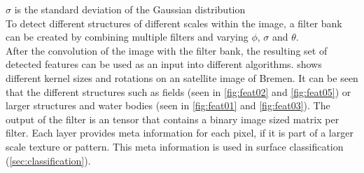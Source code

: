 \documentclass[a4paper, english]{article}
\begin{document}
    $\sigma$ is the standard deviation of the Gaussian distribution\\ 
%
    To detect different structures of different scales within the image, a filter bank can be created by combining multiple filters and varying $\phi$, $\sigma$ and $\theta$.\\
%
    After the convolution of the image with the filter bank, the resulting set of detected features can be used as an input into different algorithms.
     shows different kernel sizes and rotations on an satellite image of Bremen. 
    It can be seen that the different structures such as fields (seen in \cref{fig:feat02} and \cref{fig:feat05}) or larger structures and water bodies (seen in \cref{fig:feat01} and \cref{fig:feat03}).
    The output of the filter is an tensor that contains a binary image sized matrix per filter. Each layer provides meta information for each pixel, if it is part of a larger scale texture or pattern. 
    This meta information is used in surface classification (\cref{sec:classification}).
\end{document}

